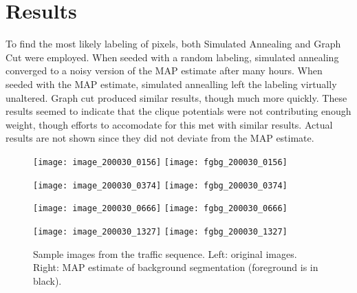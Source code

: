 \documentclass{article}
\begin{document}
\section{Results}
To find the most likely labeling of pixels, both Simulated Annealing and Graph Cut were employed.
When seeded with a random labeling, simulated annealing converged to a noisy version of the MAP estimate after many hours.  When seeded with the MAP estimate, simulated annealling left the labeling virtually unaltered.  Graph cut produced similar results, though much more quickly.  These results seemed to indicate that the clique potentials were not contributing enough weight, though efforts to accomodate for this met with similar results.  Actual results are not shown since they did not deviate from the MAP estimate.

\begin{figure}
	\centerline{
		\mbox{\texttt{[image: image\_200030\_0156]}}
		\mbox{\texttt{[image: fgbg\_200030\_0156]}}
	}
	\centerline{
		\mbox{\texttt{[image: image\_200030\_0374]}}
		\mbox{\texttt{[image: fgbg\_200030\_0374]}}
	}
	\centerline{
		\mbox{\texttt{[image: image\_200030\_0666]}}
		\mbox{\texttt{[image: fgbg\_200030\_0666]}}
	}
	\centerline{
		\mbox{\texttt{[image: image\_200030\_1327]}}
		\mbox{\texttt{[image: fgbg\_200030\_1327]}}
	}

	\caption{Sample images from the traffic sequence.  Left: original images. Right: MAP estimate of background segmentation (foreground is in black). }
	\label{fig:fgbg}
\end{figure}
\end{document}
